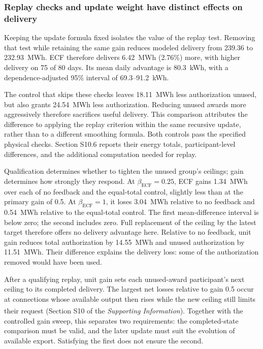 \documentclass[twoside,twocolumn,9pt]{article}
\newcommand{\suppref}{\textit{Supporting Information}\textsuperscript{\dag}}
\begin{document}
\subsubsection{Replay checks and update weight have distinct effects on delivery}
\label{sec:qualification_results}

Keeping the update formula fixed isolates the value of the replay test.
Removing that test while retaining the same gain reduces modeled
delivery from 239.36 to 232.93~MWh. ECF therefore delivers 6.42~MWh (2.76\%)
more, with higher delivery on 75 of 80 days. Its mean daily advantage is
80.3~kWh, with a dependence-adjusted 95\% interval of 69.3--91.2~kWh.

The control that skips these checks leaves 18.11~MWh less authorization unused,
but also grants 24.54~MWh less authorization. Reducing unused awards more
aggressively therefore sacrifices useful delivery. This comparison attributes
the difference to applying the replay criterion within the same recursive
update, rather than to a different smoothing formula. Both controls pass the
specified physical checks. Section S10.6 reports their energy totals,
participant-level differences, and the additional computation needed for replay.

Qualification determines whether to tighten the unused group's ceilings;
gain determines how strongly they respond. At $\beta_{\mathrm{ECF}}=0.25$, ECF
gains 1.34~MWh over each of no feedback and the equal-total control,
slightly less than at the primary gain of
0.5. At $\beta_{\mathrm{ECF}}=1$, it loses 3.04~MWh relative to no feedback
and 0.54~MWh relative to the equal-total control. The first mean-difference
interval is below zero; the second includes zero. Full replacement of the
ceiling by the latest target therefore offers no delivery advantage here.
Relative to no feedback, unit gain reduces total authorization by 14.55~MWh
and unused authorization by 11.51~MWh. Their difference explains the delivery
loss: some of the authorization removed would have been used.

After a qualifying replay, unit gain sets each unused-award participant's
next ceiling to its completed delivery. The largest net losses relative to
gain 0.5 occur at connections whose available output then rises while the new ceiling
still limits their request (Section S10 of the \suppref{}).
Together with the controlled gain sweep, this separates two requirements:
the completed-state comparison must be valid, and the later update must suit
the evolution of available export. Satisfying the first does not ensure the second.
\end{document}

